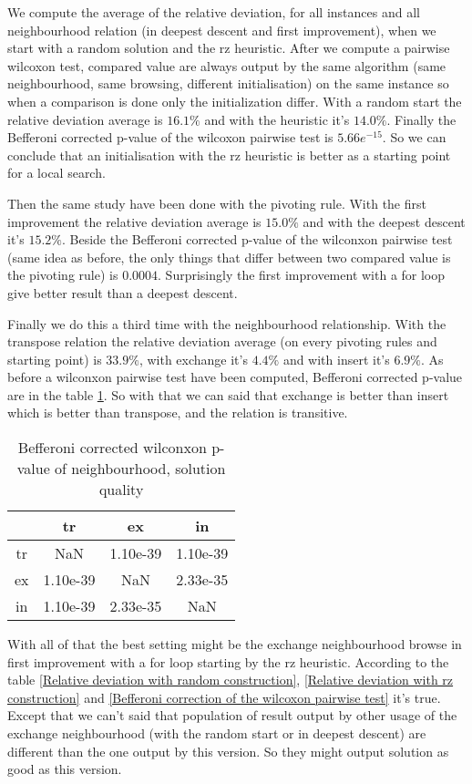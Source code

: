 \documentclass[12pt,a4paper]{article}
\begin{document}
We compute the average of the relative deviation, for all instances and all neighbourhood relation (in deepest descent and first improvement), when we start with a random solution and the rz heuristic. After we compute a pairwise wilcoxon test, compared value are always output by the same algorithm (same neighbourhood, same browsing, different initialisation) on the same instance so when a comparison is done only the initialization differ. With a random start the relative deviation average is $16.1 \%$ and with the heuristic it's $14.0 \%$. Finally the Befferoni corrected p-value of the wilcoxon pairwise test is $5.66e^{-15}$. So we can conclude that an initialisation with the rz heuristic is better as a starting point for a local search.

Then the same study have been done with the pivoting rule. With the first improvement the relative deviation average is $15.0 \%$ and with the deepest descent it's $15.2 \%$. Beside the Befferoni corrected p-value of the wilconxon pairwise test (same idea as before, the only things that differ between two compared value is the pivoting rule) is $0.0004$. Surprisingly the first improvement with a for loop give better result than a deepest descent.

Finally we do this a third time with the neighbourhood relationship. With the transpose relation the relative deviation average (on every pivoting rules and starting point) is $33.9 \%$, with exchange it's $4.4 \%$ and with insert it's $6.9 \%$.
As before a wilconxon pairwise test have been computed, Befferoni corrected p-value are in the table \ref{Befferoni corrected wilconxon p-value of neighbourhood}. So with that we can said that exchange is better than insert which is better than transpose, and the relation is transitive.

\begin{table}[!h]
\centering
\begin{tabular}{|*{4}{c|}}
  \hline
   & tr & ex & in\\
  \hline
	tr & NaN & 1.10e-39 & 1.10e-39 \\
	ex & 1.10e-39 & NaN & 2.33e-35 \\
	in & 1.10e-39 & 2.33e-35 & NaN \\
  \hline
\end{tabular}
\caption{Befferoni corrected wilconxon p-value of neighbourhood, solution quality}
\label{Befferoni corrected wilconxon p-value of neighbourhood}
\end{table}

With all of that the best setting might be the exchange neighbourhood browse in first improvement with a for loop starting by the rz heuristic. According to the table \ref{Relative deviation with random construction}, \ref{Relative deviation with rz construction} and \ref{Befferoni correction of the wilcoxon pairwise test} it's true. Except that we can't said that population of result output by other usage of the exchange neighbourhood (with the random start or in deepest descent) are different than the one output by this version. So they might output solution as good as this version.\\
\end{document}
